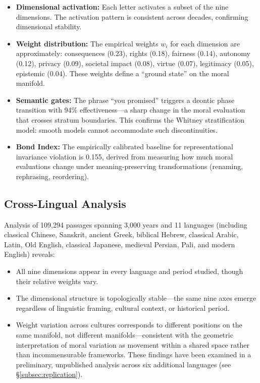 \documentclass[12pt]{article}
\theoremstyle{definition}
\theoremstyle{remark}
\begin{document}
\begin{itemize}
    \item \textbf{Dimensional activation:} Each letter activates a subset of the nine dimensions. The activation pattern is consistent across decades, confirming dimensional stability.
    \item \textbf{Weight distribution:} The empirical weights $w_i$ for each dimension are approximately: consequences (0.23), rights (0.18), fairness (0.14), autonomy (0.12), privacy (0.09), societal impact (0.08), virtue (0.07), legitimacy (0.05), epistemic (0.04). These weights define a ``ground state'' on the moral manifold.
    \item \textbf{Semantic gates:} The phrase ``you promised'' triggers a deontic phase transition with 94\% effectiveness---a sharp change in the moral evaluation that crosses stratum boundaries. This confirms the Whitney stratification model: smooth models cannot accommodate such discontinuities.
    \item \textbf{Bond Index:} The empirically calibrated baseline for representational invariance violation is 0.155, derived from measuring how much moral evaluations change under meaning-preserving transformations (renaming, rephrasing, reordering).
\end{itemize}

\subsection{Cross-Lingual Analysis}

Analysis of 109,294 passages spanning 3,000 years and 11 languages (including classical Chinese, Sanskrit, ancient Greek, biblical Hebrew, classical Arabic, Latin, Old English, classical Japanese, medieval Persian, Pali, and modern English) reveals:

\begin{itemize}
    \item All nine dimensions appear in every language and period studied, though their relative weights vary.
    \item The dimensional structure is topologically stable---the same nine axes emerge regardless of linguistic framing, cultural context, or historical period.
    \item Weight variation across cultures corresponds to different positions on the same manifold, not different manifolds---consistent with the geometric interpretation of moral variation as movement within a shared space rather than incommensurable frameworks. These findings have been examined in a preliminary, unpublished analysis across six additional languages (see \S\ref{subsec:replication}).
\end{itemize}
\end{document}
